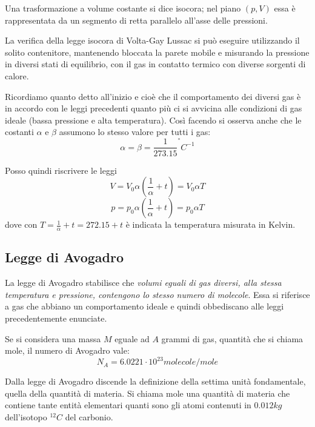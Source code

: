 \documentclass[class=book, crop=false, oneside, 12pt]{standalone}
\begin{document}
Una trasformazione a volume costante si dice isocora; nel piano \(( p, V )\) essa è rappresentata da un segmento di retta parallelo all'asse delle pressioni.

La verifica della legge isocora di Volta-Gay Lussac si può eseguire utilizzando il solito contenitore, mantenendo bloccata la parete mobile e misurando la pressione in diversi stati di equilibrio, con il gas in contatto termico con diverse sorgenti di calore.

Ricordiamo quanto detto all'inizio e cioè che il comportamento dei diversi gas è in accordo con le leggi precedenti quanto più ci si avvicina alle condizioni di gas ideale (bassa pressione e alta temperatura). 
Così facendo si osserva anche che le costanti \(\alpha\) e \(\beta\) assumono lo stesso valore per tutti i gas: 
\begin{equation*}
    \alpha = \beta = \frac{1}{273.15} ^{\circ} C^{-1}
\end{equation*}

Posso quindi riscrivere le leggi 
\begin{equation}
    V = V_0 \alpha (\frac{1}{\alpha} + t) = V_0 \alpha T
\end{equation}
\begin{equation}
    p = p_0 \alpha (\frac{1}{\alpha} + t) = p_0 \alpha T
\end{equation}
dove con \(T = \frac{1}{\alpha} + t = 272.15 + t \) è indicata la temperatura misurata in Kelvin.

\subsection{Legge di Avogadro}

La legge di Avogadro stabilisce che \emph{volumi eguali di gas diversi, alla stessa temperatura e pressione, contengono lo stesso numero di molecole}.
Essa si riferisce a gas che abbiano un comportamento ideale e quindi obbediscano alle leggi precedentemente enunciate.

Se si considera una massa \(M\) eguale ad \(A\) grammi di gas, quantità che si chiama mole, il numero di Avogadro vale:
\begin{equation*}
    N_A = 6.0221 \cdot 10^{23} molecole/mole
\end{equation*}

Dalla legge di Avogadro discende la definizione della settima unità fondamentale, quella della quantità di materia. 
Si chiama mole una quantità di materia che contiene tante entità elementari quanti sono gli atomi contenuti in \(0.012 kg\) dell'isotopo \(^{12} C\) del carbonio.
\end{document}
